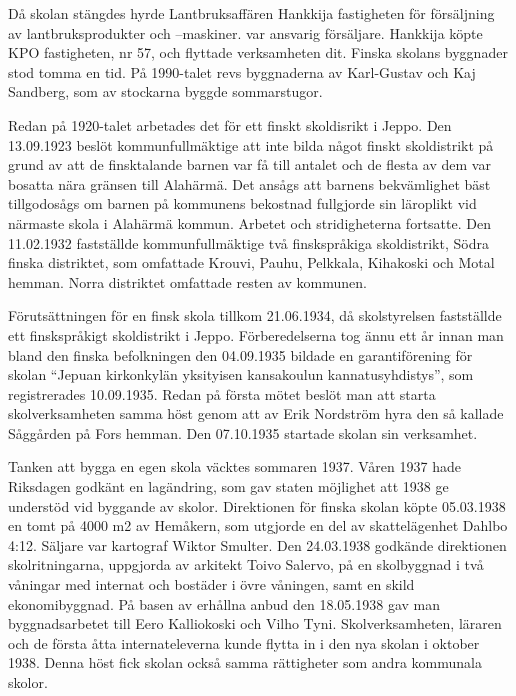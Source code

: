 Då skolan stängdes hyrde Lantbruksaffären Hankkija fastigheten för försäljning av lantbruksprodukter och –maskiner.  var ansvarig försäljare. Hankkija köpte KPO fastigheten, nr 57, och flyttade verksamheten dit. Finska skolans byggnader stod tomma en tid. På 1990-talet revs byggnaderna av Karl-Gustav och Kaj Sandberg, som av stockarna byggde sommarstugor.


Redan på 1920-talet arbetades det för ett finskt skoldisrikt i Jeppo.	Den 13.09.1923 beslöt kommunfullmäktige att inte bilda något finskt skoldistrikt på grund av att de finsktalande barnen var få till antalet och de flesta av dem var bosatta nära gränsen till Alahärmä. Det ansågs att barnens bekvämlighet bäst tillgodosågs om barnen på kommunens 	bekostnad fullgjorde sin läroplikt vid närmaste skola i Alahärmä kommun. Arbetet och stridigheterna fortsatte. Den 11.02.1932 fastställde kommunfullmäktige två finskspråkiga skoldistrikt, Södra finska distriktet, som omfattade Krouvi, Pauhu, Pelkkala, Kihakoski och Motal	hemman. Norra distriktet omfattade resten av kommunen.

Förutsättningen för en finsk skola tillkom 21.06.1934, då skolstyrelsen fastställde ett finskspråkigt skoldistrikt i Jeppo. Förberedelserna tog ännu ett år innan man bland den finska befolkningen den 04.09.1935	bildade en garantiförening för skolan ``Jepuan kirkonkylän yksityisen	kansakoulun kannatusyhdistys'', som registrerades 10.09.1935.	Redan på första mötet beslöt man att starta skolverksamheten samma höst genom att av Erik Nordström hyra den så kallade Såggården på	Fors hemman. Den 07.10.1935 startade skolan sin verksamhet.

Tanken att bygga en egen skola väcktes sommaren 1937. Våren 1937 hade Riksdagen godkänt en lagändring, som gav staten möjlighet att 1938 ge understöd vid byggande av skolor. Direktionen för finska skolan köpte	05.03.1938 en tomt på 4000 m2 av Hemåkern, som utgjorde en del av skattelägenhet Dahlbo 4:12. Säljare var kartograf Wiktor Smulter. Den	24.03.1938 godkände direktionen skolritningarna, uppgjorda av arkitekt Toivo Salervo, på en skolbyggnad i två våningar med internat och bostäder i övre våningen, samt en skild ekonomibyggnad. På basen av	erhållna anbud den 18.05.1938 gav man byggnadsarbetet till Eero Kalliokoski och Vilho Tyni. Skolverksamheten, läraren och de första åtta internateleverna kunde flytta in i den nya skolan i oktober 1938. Denna höst fick skolan också samma rättigheter som andra kommunala skolor.

